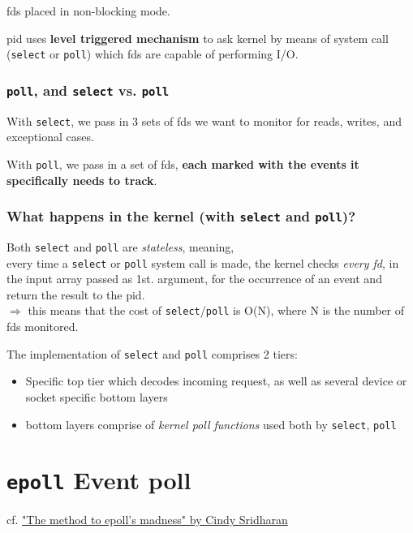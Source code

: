 \documentclass[10pt]{amsart}
\begin{document}
\begin{multicols*}{2}
fds placed in non-blocking mode.

pid uses \textbf{level triggered mechanism} to ask kernel by means of system call (\texttt{select} or \texttt{poll}) which fds are capable of performing I/O. 

\subsubsection{\texttt{poll}, and \texttt{select} vs. \texttt{poll} }

With \texttt{select}, we pass in 3 sets of fds we want to monitor for reads, writes, and exceptional cases.

With \texttt{poll}, we pass in a set of fds, \textbf{each marked with the events it specifically needs to track}.

\subsubsection{What happens in the kernel (with \texttt{select} and \texttt{poll})?}

Both \texttt{select} and \texttt{poll} are \emph{stateless}, meaning, \\
every time a \texttt{select} or \texttt{poll} system call is made, the kernel checks \emph{every fd}, in the input array passed as 1st. argument, for the occurrence of an event and return the result to the pid. \\
$\Longrightarrow$ this means that the cost of \texttt{select}/\texttt{poll} is O(N), where N is the number of fds monitored.

The implementation of \texttt{select} and \texttt{poll} comprises 2 tiers:
\begin{itemize}
	\item Specific top tier which decodes incoming request, as well as several device or socket specific bottom layers
	\item bottom layers comprise of \emph{kernel poll functions} used both by \texttt{select}, \texttt{poll}
\end{itemize}

\section{\texttt{epoll} Event poll}

cf. \href{https://medium.com/@copyconstruct/the-method-to-epolls-madness-d9d2d6378642}{"The method to epoll's madness" by Cindy Sridharan}\cite{Srid2017}


\end{multicols*}
\end{document}

